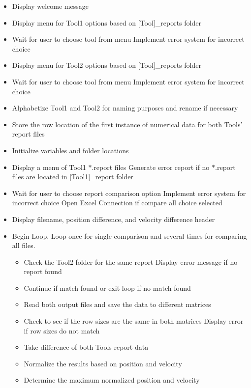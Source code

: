 \begin{itemize}
    \item Display welcome message
    \item Display menu for Tool1 options based on [Tool]\_reports folder
    \item Wait for user to choose tool from menu
        \subitem Implement error system for incorrect choice
    \item Display menu for Tool2 options based on [Tool]\_reports folder
    \item Wait for user to choose tool from menu
        \subitem Implement error system for incorrect choice
    \item Alphabetize Tool1 and Tool2 for naming purposes and rename
    if necessary
    \item Store the row location of the first instance of numerical
    data for both Tools' report files
    \item Initialize variables and folder locations
    \item Display a menu of Tool1 $*$.report files
        \subitem Generate error report if no $*$.report files are located
    in [Tool1]\_report folder
    \item Wait for user to choose report comparison option
        \subitem Implement error system for incorrect choice
        \subitem Open Excel Connection if compare all choice selected
    \item Display filename, position difference, and velocity difference header
    \item Begin Loop. Loop once for single comparison and several
    times for comparing all files.
    \begin{itemize}
        \item Check the Tool2 folder for the same report
            \subitem Display error message if no report found
        \item Continue if match found or exit loop if no match found
        \item Read both output files and save the data to different matrices
        \item Check to see if the row sizes are the same in
        both matrices
            \subitem Display error if row sizes do not match
        \item Take difference of both Tools report data
        \item Normalize the results based on position and velocity
        \item Determine the maximum normalized position and velocity

\end{itemize}
\end{itemize}
